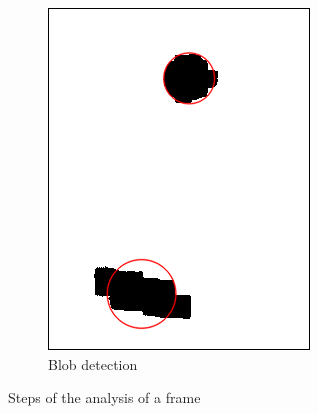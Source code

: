 \begin{figure}
\begin{subfigure}{0.25\textwidth}
\includegraphics[width=\textwidth]{img/motan_4}
\caption{Blob detection}
\label{fig:motkey}
\end{subfigure}
\caption{Steps of the analysis of a frame}
\label{fig:motstep}
\end{figure}

